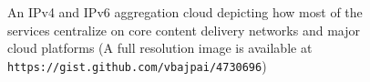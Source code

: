 \begin{figure}[t]
  \begin{minipage}[t]{0.50\textwidth}
    \centering
  \end{minipage}
  \begin{minipage}[t]{0.50\textwidth}
    \centering
  \end{minipage}
  \caption{\label{fig:v4-v6-cloud}An IPv4 and IPv6 aggregation cloud depicting
how most of the services centralize on core content delivery networks and
major cloud platforms (A full resolution image is available at
\texttt{https://gist.github.com/vbajpai/4730696})}
\end{figure}

